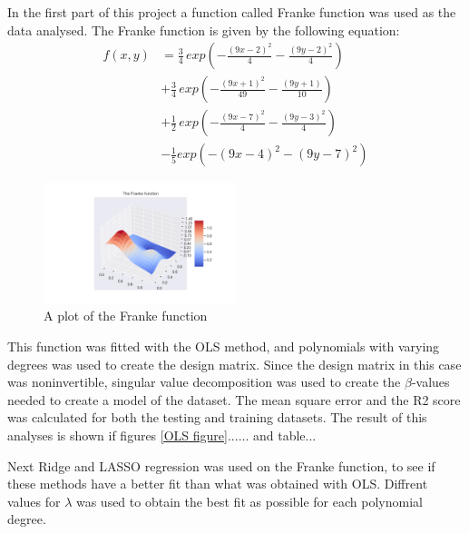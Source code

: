 \thispagestyle{plain}

\noindent In the first part of this project a function called Franke function
 was used as the data analysed. The Franke function is given by the following 
 equation:
\begin{align*}
    f(x,y) &= \frac{3}{4} \, exp\left(- \frac{(9x-2)^2}{4} - \frac{(9y-2)^2}{4}\right) \\
    &+ \frac{3}{4}\, exp\left( - \frac{(9x +1)^2}{49} - \frac{(9y+1)}{10}\right) \\
    &+ \frac{1}{2}\, exp\left( -\frac{(9x-7)^2}{4} - \frac{(9y-3)^2}{4}\right) \\
    &- \frac{1}{5} exp \left( - (9x -4)^2 - (9y-7)^2\right)
\end{align*}
\begin{figure}[H]
	\centering
	\includegraphics[width=0.5\textwidth]{Figure_1.png}
	\caption{\centering A plot of the Franke function }
	\label{Franke function}
\end{figure}
\noindent This function was fitted with the OLS method, 
and polynomials with varying degrees was used to create the design matrix.
Since the design matrix in this case was noninvertible, singular value 
decomposition was used to create the $\beta$-values needed to create a model
of the dataset. The mean square error and the R2 score was calculated 
for both the testing and training datasets. The result of this analyses is 
shown if figures \eqref{OLS figure}...... and table... \newline \newline

\noindent Next Ridge and LASSO regression was used on the Franke function,
to see if these methods have a better fit than what was obtained with OLS.
Diffrent values for $\lambda$ was used to obtain the best fit as possible for each
polynomial degree.
